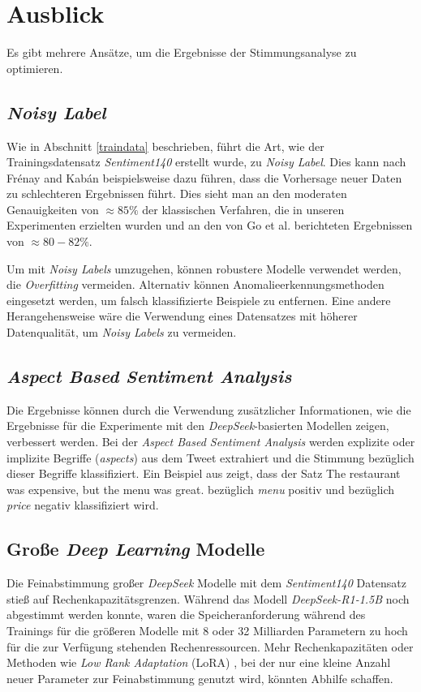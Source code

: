 \section{Ausblick}

Es gibt mehrere Ansätze, um die Ergebnisse der Stimmungsanalyse zu optimieren.

\subsection{\textit{Noisy Label}}
Wie in Abschnitt \ref{traindata} beschrieben, führt die Art, wie der Trainingsdatensatz \textit{Sentiment140} erstellt wurde, zu \textit{Noisy Label}.
Dies kann nach Fr{\'e}nay and Kab{\'a}n \cite{NoisyLabel2014} beispielsweise dazu führen, dass die Vorhersage neuer Daten zu schlechteren Ergebnissen führt.
Dies sieht man an den moderaten Genauigkeiten von $\approx{85}\%$ der klassischen Verfahren, die in unseren Experimenten erzielten wurden und an den von Go et al. \cite{go2009twitter} berichteten Ergebnissen von $\approx{80-82}\%$.

Um mit \textit{Noisy Labels} umzugehen, können robustere Modelle verwendet werden, die \textit{Overfitting} vermeiden.
Alternativ können Anomalieerkennungsmethoden eingesetzt werden, um falsch klassifizierte Beispiele zu entfernen.
Eine andere Herangehensweise wäre die Verwendung eines Datensatzes mit höherer Datenqualität, um \textit{Noisy Labels} zu vermeiden.

\subsection{\textit{Aspect Based Sentiment Analysis}}

Die Ergebnisse können durch die Verwendung zusätzlicher Informationen, wie die Ergebnisse für die Experimente mit den \textit{DeepSeek}-basierten Modellen zeigen, verbessert werden.
Bei der \textit{Aspect Based Sentiment Analysis} werden explizite oder implizite Begriffe (\textit{aspects}) aus dem Tweet extrahiert und die Stimmung bezüglich dieser Begriffe klassifiziert.
Ein Beispiel aus \cite{Hua_2024} zeigt, dass der Satz \glqq The restaurant was expensive, but the menu was great.\grqq{} bezüglich \textit{menu} positiv und bezüglich \textit{price} negativ klassifiziert wird.

\subsection{Große \textit{Deep Learning} Modelle}

Die Feinabstimmung großer \textit{DeepSeek} Modelle mit dem \textit{Sentiment140} Datensatz stieß auf Rechenkapazitätsgrenzen.
Während das Modell \textit{DeepSeek-R1-1.5B} noch abgestimmt werden konnte, waren die Speicheranforderung während des Trainings für die größeren Modelle mit 8 oder 32 Milliarden Parametern zu hoch für die zur Verfügung stehenden Rechenressourcen.
Mehr Rechenkapazitäten oder Methoden wie \textit{Low Rank Adaptation} (LoRA) \cite{lora2021}, bei der nur eine kleine Anzahl neuer Parameter zur Feinabstimmung genutzt wird, könnten Abhilfe schaffen.
